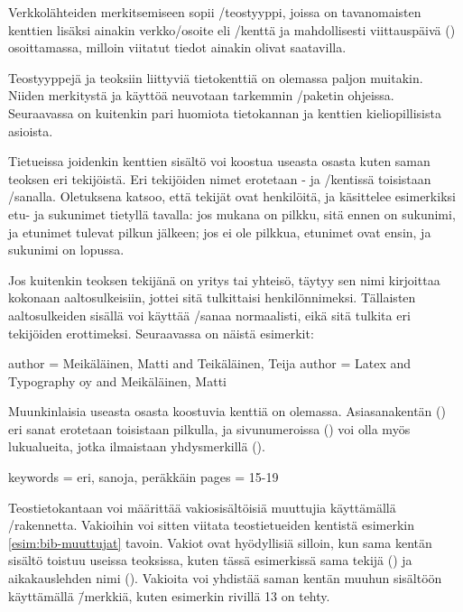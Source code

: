 Verkkolähteiden%
 merkitsemiseen sopii \-/teostyyppi,
joissa on ta\-van\-omais\-ten kenttien lisäksi ainakin verkko\-/osoite
eli \-/kenttä ja mahdollisesti viittauspäivä
() osoittamassa, milloin viitatut tiedot ainakin olivat
saatavilla.

Teostyyppejä ja teoksiin liittyviä tietokenttiä on olemassa paljon
muitakin. Niiden merkitystä ja käyttöä neuvotaan tarkemmin
\-/paketin ohjeissa. Seuraavassa on kuitenkin pari
huomiota tietokannan ja kenttien kieli\-opillisista asioista.

Tietueissa joidenkin kenttien sisältö voi koostua useasta osasta kuten
saman teoksen eri tekijöistä. Eri tekijöiden nimet erotetaan
- ja \-/kentissä toisistaan
\-/sanalla. Oletuksena  katsoo, että
tekijät ovat henkilöitä, ja käsittelee esimerkiksi etu- ja sukunimet
tietyllä tavalla: jos mukana on pilkku, sitä ennen on sukunimi, ja
etunimet tulevat pilkun jälkeen; jos ei ole pilkkua, etunimet ovat
ensin, ja sukunimi on lopussa.

Jos kuitenkin teoksen tekijänä on yritys tai yhteisö, täytyy sen nimi
kirjoittaa kokonaan aaltosulkeisiin, jottei sitä tulkittaisi
henkilönnimeksi. Tällaisten aaltosulkeiden sisällä voi käyttää
\-/sanaa normaalisti, eikä sitä tulkita eri tekijöiden
erottimeksi. Seuraavassa on näistä esimerkit:

\begin{koodilohkosis}
  author = {Meikäläinen, Matti and Teikäläinen, Teija}
  author = {{Latex and Typography oy} and Meikäläinen, Matti}
\end{koodilohkosis}

Muunkinlaisia useasta osasta koostuvia kenttiä on olemassa.
Asiasanakentän () eri sanat erotetaan toisistaan
pilkulla, ja sivunumeroissa () voi olla myös luku\-alueita,
jotka ilmaistaan yhdysmerkillä \mbox{(\koodi{-})}.

\begin{koodilohkosis}
  keywords = {eri, sanoja, peräkkäin}
  pages = {15-19}
\end{koodilohkosis}

Teostietokantaan voi määrittää vakiosisältöisiä muuttujia käyttämällä
\-/rakennetta. Vakioihin voi sitten viitata
teostietueiden kentistä esimerkin \ref{esim:bib-muuttujat} tavoin.
Vakiot ovat hyödyllisiä silloin, kun sama kentän sisältö toistuu useissa
teoksissa, kuten tässä esimerkissä sama tekijä () ja
aikakauslehden nimi (). Vakioita voi yhdistää
saman kentän muuhun sisältöön käyttämällä \koodi{\#}\=/merkkiä, kuten
esimerkin rivillä 13 on tehty.

